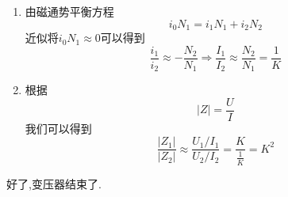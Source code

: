 \begin{enumerate}
    \item [\circledtext{2}] 
    由磁通势平衡方程
    \begin{equation*}
        i_0N_1=i_1N_1+i_2N_2
    \end{equation*}
    近似将$i_0N_1\approx 0$可以得到
    \begin{equation*}
        \frac{i_1}{i_2}\approx -\frac{N_2}{N_1}\Longrightarrow \frac{I_1}{I_2}\approx \frac{N_2}{N_1}=\frac{1}{K}
    \end{equation*}
    \item [\circledtext{3}]
    根据
    \begin{equation*}
        \left| Z \right|=\frac{U}{I}
    \end{equation*}
    我们可以得到
    \begin{equation*}
        \frac{\left| Z_1 \right|}{\left| Z_2 \right|}\approx \frac{U_1/I_1}{U_2/I_2}=\frac{K}{\frac{1}{K}}=K^2
    \end{equation*}
\end{enumerate}
\Par 好了,变压器结束了.